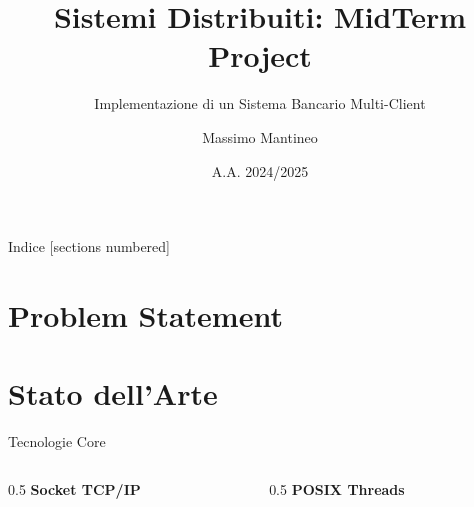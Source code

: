 \documentclass[10pt]{beamer}
\title{Sistemi Distribuiti: MidTerm Project}
\subtitle{Implementazione di un Sistema Bancario Multi-Client}
\date{A.A. 2024/2025}
\author{Massimo Mantineo}
\institute{Università degli Studi di Messina\\Dipartimento MIFT}
\begin{document}
\maketitle

\begin{frame}{Indice}
  [sections numbered]
  \tableofcontents[hideallsubsections]
\end{frame}

\section{Problem Statement}

\section{Stato dell'Arte}
\begin{frame}{Tecnologie Core}
  \begin{columns}
    \begin{column}{0.5\textwidth}
      \textbf{Socket TCP/IP}
      
    \end{column}
    \begin{column}{0.5\textwidth}
      \textbf{POSIX Threads}
      
    \end{column}
  \end{columns}
\end{frame}
\end{document}
